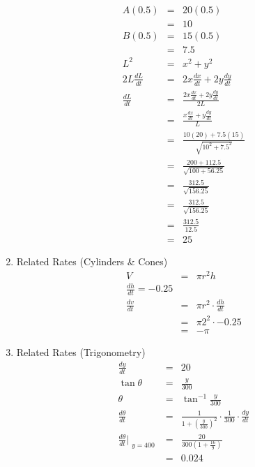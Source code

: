 \documentclass{article}
\begin{document}
\begin{enumerate}
\begin{eqnarray}
        A(0.5) &=& 20(0.5) \\
               &=& 10 \\
        B(0.5) &=& 15(0.5) \\
               &=& 7.5 \\
        L^2 &=& x^2 + y^2 \\
        2L\frac{dL}{dt} &=& 2x\frac{dx}{dt} + 2y\frac{dy}{dt} \\
        \frac{dL}{dt} &=& \frac{2x\frac{dx}{dt} + 2y\frac{dy}{dt}}{2L} \\
                      &=& \frac{x\frac{dx}{dt} + y\frac{dy}{dt}}{L} \\
                      &=& \frac{10(20) + 7.5(15)}{\sqrt{10^2 + 7.5^2}} \\
                      &=& \frac{200 + 112.5}{\sqrt{100 + 56.25}} \\
                      &=& \frac{312.5}{\sqrt{156.25}} \\
                      &=& \frac{312.5}{\sqrt{156.25}} \\
                      &=& \frac{312.5}{12.5} \\
                      &=& 25
    \end{eqnarray}
    \item Related Rates (Cylinders \& Cones)
    \begin{eqnarray}
        V &=& \pi r^2h \\
        \frac{dh}{dt} = -0.25 \\
        \frac{dv}{dt} &=& \pi r^2 \cdot \frac{dh}{dt} \\
                      &=& \pi 2^2 \cdot -0.25 \\
                      &=& -\pi
    \end{eqnarray}
    \item Related Rates (Trigonometry)
    \begin{eqnarray}
        \frac{dy}{dt} &=& 20 \\
        \tan{\theta} &=& \frac{y}{300} \\
        \theta &=& \tan^{-1}{\frac{y}{300}} \\
        \frac{d\theta}{dt} &=& \frac{1}{1 + \left(\frac{y}{300}\right)^2} \cdot \frac{1}{300} \cdot \frac{dy}{dt} \\
        \frac{d\theta}{dt}\Bigr|_{\substack{y = 400}} &=& \frac{20}{300\left(1 + \frac{16}{9}\right)} \\
                                                      &=& 0.024
    \end{eqnarray}
\end{enumerate}
\end{document}
